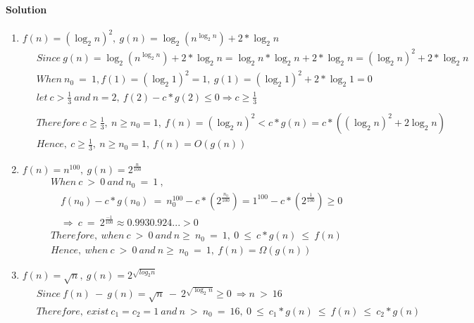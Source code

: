 \documentclass[a4paper]{scrartcl}
\begin{document}
\paragraph{Solution}
\begin{enumerate}[label=(\alph*)]
  \item $f(n)=\left(\log_2n\right)^2,\ g(n)=\log_2\left(n^{\log_2{n}}\right) + 2*\log_2{n}$
  \begin{align*}
  &\ Since\ g(n)= \log_2\left(n^{\log_2{n}}\right) + 2*\log_2{n} = \log_2{n}*\log_2{n} + 2*\log_2{n} = \left(\log_2{n}\right)^2 + 2*\log_2{n}\\ &\ 
  When\ n_0\ =\ 1, f(1) = (\log_2{1})^2 = 1,\ g(1) = \left(\log_2{1}\right)^2 + 2*\log_2{1} = 0\\ &\
  let\ c > \frac{1}{3}\ and\ n = 2,\ f(2)-c*g(2) \leq 0 \Rightarrow c \geq \frac{1}{3}\\ &\
  \end{align*}
  \begin{align*}
  &\ Therefore\ c\geq \frac{1}{3}, \ n \geq n_0 = 1,\ f(n)=\left(\log_2{n}\right)^2 < c*g(n) = c*(\left(\log_2{n}\right)^2 + 2\log_2{n})\\ &\
  Hence,\ c\geq \frac{1}{3}, \ n \geq n_0 = 1,\ f(n) = O(g(n))
  \end{align*}
  \item $f(n)= n^{100},\ g(n)=2^{\frac{n}{100}}$
  \begin{align*}
  &\ When\ c\ >\ 0\ and\ n_0\ = \ 1\ ,\\ &\
  \quad f(n_0) - c*g(n_0)\ =\ n_0^{100}-c*(2^\frac{n_0}{100})  = 1^{100}- c*(2^{\frac{1}{100}}) \geq 0\\ &\ 
  \quad\Rightarrow\ c\ =\ 2^{\frac{-1}{100}} \approx 0.9930.924... > 0\\ &\
  Therefore,\ when\ c\ >\ 0\ and\ n \geq \ n_0\ = \ 1,\ 0\ \leq\ c*g(n)\ \leq\ f(n)\\ &\ 
  Hence, \ when\ c\ >\ 0\ and\ n \geq \ n_0\ = \ 1,\ f(n) = \Omega(g(n))
  \end{align*}
  \item $f(n)=\sqrt{n},\ g(n)=2^{\sqrt{log_2 n}}$
  \begin{align*}
  &\ Since\ f(n)\ -\ g(n)=\sqrt{n}\ -\ 2^{\sqrt{\log_2 n}} \geq 0\ \Rightarrow n\ >\ 16\\ &\
  Therefore,\ exist\ c_1=c_2=1\ and\ n\ >\ n_0\ =\ 16,\ 0\ \leq\ c_1*g(n)\ \leq\ f(n)\ \leq\ c_2*g(n)\\ &\ 

\end{align*}
\end{enumerate}
\end{document}
